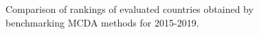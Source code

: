 \documentclass[final,5p,times,twocolumn,authoryear]{elsarticle}
\begin{document}
%
\begin{figure}[ht!]
\centering
\quad
{}
\caption{Comparison of rankings of evaluated countries obtained by benchmarking MCDA methods for 2015-2019.}
\label{fig:radars}
\end{figure}
%
\end{document}
